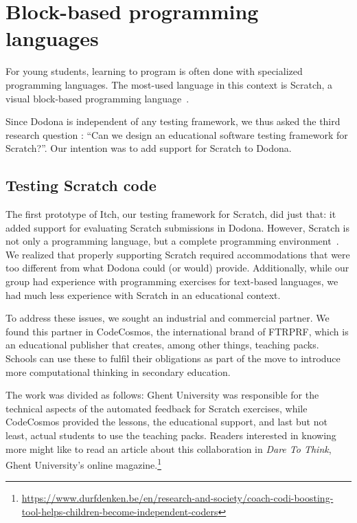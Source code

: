 \documentclass[../main]{subfiles}
\begin{document}
\section{Block-based programming languages}\label{sec:the-second-part:-scratch}

For young students, learning to program is often done with specialized programming languages.
The most-used language in this context is Scratch, a visual block-based programming language~\autocite{resnickScratchProgrammingAll2009}.

Since Dodona is independent of any testing framework, we thus asked the third research question : ``Can we design an educational software testing framework for Scratch?''.
Our intention was to add support for Scratch to Dodona.

\subsection{Testing Scratch code}\label{subsec:testing-scrath-code}

The first prototype of Itch, our testing framework for Scratch, did just that: it added support for evaluating Scratch submissions in Dodona.
However, Scratch is not only a programming language, but a complete programming environment~\autocite{maloneyScratchProgrammingLanguage2010}.
We realized that properly supporting Scratch required accommodations that were too different from what Dodona could (or would) provide.
Additionally, while our group had experience with programming exercises for text-based languages, we had much less experience with Scratch in an educational context.

To address these issues, we sought an industrial and commercial partner.
We found this partner in CodeCosmos, the international brand of FTRPRF, which is an educational publisher that creates, among other things, teaching packs.
Schools can use these to fulfil their obligations as part of the move to introduce more computational thinking in secondary education.

The work was divided as follows: Ghent University was responsible for the technical aspects of the automated feedback for Scratch exercises, while CodeCosmos provided the lessons, the educational support, and last but not least, actual students to use the teaching packs.
Readers interested in knowing more might like to read an article about this collaboration in \textit{Dare To Think}, Ghent University's online magazine.\footnote{\url{https://www.durfdenken.be/en/research-and-society/coach-codi-boosting-tool-helps-children-become-independent-coders}}
\end{document}
